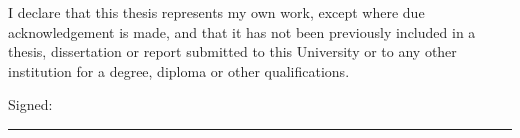 


\begin{declaration}        %


I declare that this thesis represents my own work, except where due acknowledgement is made, and that it has not been previously included in a thesis, dissertation or report submitted to this University or to any other institution for a degree, diploma or other qualifications. 
 
\vfill

\noindent Signed:\\
\rule[1em]{25em}{0.5pt}  %

\authorname \\
\mydate
 
\end{declaration}



